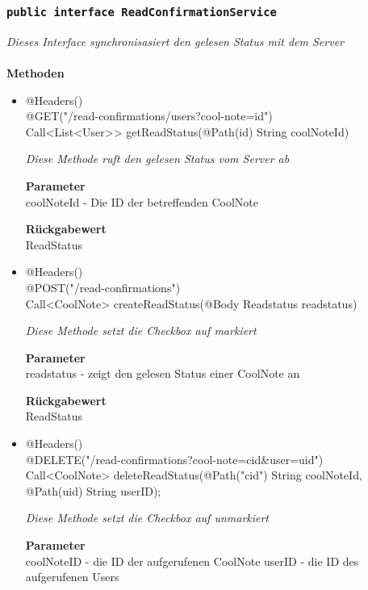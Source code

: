 	\subsubsection{\texttt{public interface  ReadConfirmationService }}
\textit{ Dieses Interface synchronisasiert den gelesen Status mit dem Server}\\
\\
	\textbf{Methoden} \\

    \begin{itemize}
		\item{@Headers()\\@GET("/read-confirmations/users?cool-note={id}") \\ Call<List<User>> getReadStatus(@Path(\grqq id\grqq) String coolNoteId)}

		\textit{Diese Methode ruft den gelesen Status vom Server ab}

		\textbf{Parameter} \\
	 coolNoteId - Die ID der betreffenden CoolNote

		\textbf{Rückgabewert} \\
	ReadStatus

	\item{@Headers()\\ @POST("/read-confirmations") \\ Call<CoolNote> createReadStatus(@Body Readstatus readstatus) } 

		\textit{Diese Methode setzt die Checkbox auf markiert}

		\textbf{Parameter} \\
	 readstatus - zeigt den gelesen Status einer CoolNote an

		\textbf{Rückgabewert} \\
	ReadStatus



	\item{@Headers()\\ @DELETE("/read-confirmations?cool-note={cid}\&user={uid}")}
\\Call<CoolNote> deleteReadStatus(@Path("cid") String coolNoteId,
			     @Path(\grqq uid\grqq) String userID);

		\textit{Diese Methode setzt die Checkbox auf unmarkiert}

		\textbf{Parameter} \\
	coolNoteID - die ID der aufgerufenen CoolNote
	userID - die ID des aufgerufenen Users

	
	 \end{itemize}


